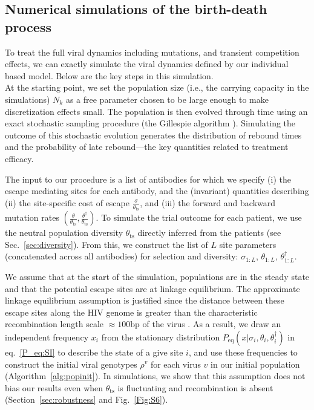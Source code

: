 \documentclass[11pt]{article}
\newcommand{\eq}{{\text{eq}}}
\newcommand{\ts}{{\text{ts}}}
\begin{document}
\subsection{Numerical simulations of the birth-death process}
To treat the full viral dynamics including mutations, and transient competition effects, we can exactly simulate the viral dynamics defined by our individual based model. Below are the key steps in this simulation.\\





At the starting point, we set the population size  (i.e., the carrying capacity in the simulations) $N_k$ as a free parameter chosen to be large enough to make discretization effects small.
The population is then evolved through time using an exact stochastic sampling procedure (the Gillespie algorithm \cite{gillespieExactStochasticSimulation1977}).
 Simulating the outcome of this stochastic evolution generates the distribution of rebound times and the probability of late rebound---the key quantities related to treatment efficacy.

The input to our procedure is a list of antibodies for which we specify (i)  the escape mediating sites for each antibody, and the (invariant) quantities describing (ii)  the site-specific  cost of escape $\frac{\sigma}{\theta_{\ts}}$, and  (iii) the forward and backward mutation rates $(\frac{\theta}{\theta_{\ts}}, \frac{\theta^\dagger}{\theta_{\ts}})$. To simulate the trial outcome for each patient, we use the neutral population diversity  $\theta_{\ts}$ directly inferred from the patients (see Sec.~\ref{sec:diversity}). From this, we construct the list of $L$ site parameters (concatenated across all antibodies) for selection and diversity: $\sigma_{1:L}$, $\theta_{1:L}$, $\theta^{\dagger}_{1:L}$. 


We assume that at the start of the simulation, populations are in the steady state and that the potential escape sites are at linkage equilibrium. The approximate  linkage equilibrium  assumption is  justified  since the distance between  these escape sites along the HIV genome is greater than the characteristic recombination length scale $\approx 100\text{bp}$ of the virus \cite{Zanini:2015gg}. As  a result, we draw an independent frequency $x_i$ from the  stationary distribution $P_\eq(x|\sigma_i,\theta_i,\theta^\dagger_i)$ in eq.~\ref{P_eq:SI} to describe the state of a give site $i$, and use these frequencies to construct the initial viral genotypes $\rho^{v}$ for each virus $v$ in our initial population (Algorithm~\ref{alg:popinit}). 
 In simulations, we show that this assumption does not bias our results even when $\theta_{\ts}$ is fluctuating and recombination is absent (Section~\ref{sec:robustness} and Fig.~\ref{Fig:S6}).
\end{document}

